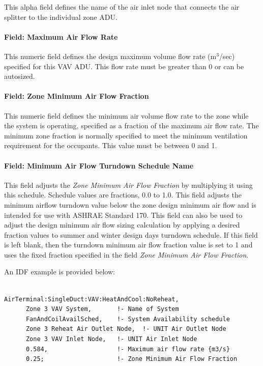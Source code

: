 This alpha field defines the name of the air inlet node that connects the air splitter to the individual zone ADU.

\paragraph{Field: Maximum Air Flow Rate}\label{field-maximum-air-flow-rate-5}

This numeric field defines the design maximum volume flow rate (m\(^{3}\)/sec) specified for this VAV ADU. This flow rate must be greater than 0 or can be autosized.

\paragraph{Field: Zone Minimum Air Flow Fraction}\label{field-zone-minimum-air-flow-fraction-2}

This numeric field defines the minimum air volume flow rate to the zone while the system is operating, specified as a fraction of the maximum air flow rate. The minimum zone fraction is normally specified to meet the minimum ventilation requirement for the occupants. This value must be between 0 and 1.

\paragraph{Field: Minimum Air Flow Turndown Schedule Name}

This field adjusts the \textit{Zone Minimum Air Flow Fraction} by multiplying it using this schedule. Schedule values are fractions, 0.0 to 1.0. This field adjusts the minimum airflow turndown value below the zone design minimum air flow and is intended for use with ASHRAE Standard 170. This field can also be used to adjust the design minimum air flow sizing calculation by applying a desired fraction values to summer and winter design days turndown schedule. If this field is left blank, then the turndown minimum air flow fraction value is set to 1 and uses the fixed fraction specified in the field \textit{Zone Minimum Air Flow Fraction}.

An IDF example is provided below:

\begin{lstlisting}

AirTerminal:SingleDuct:VAV:HeatAndCool:NoReheat,
      Zone 3 VAV System,       !- Name of System
      FanAndCoilAvailSched,    !- System Availability schedule
      Zone 3 Reheat Air Outlet Node,  !- UNIT Air Outlet Node
      Zone 3 VAV Inlet Node,   !- UNIT Air Inlet Node
      0.584,                   !- Maximum air flow rate {m3/s}
      0.25;                    !- Zone Minimum Air Flow Fraction
\end{lstlisting}

